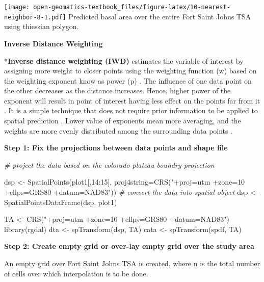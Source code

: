\documentclass[
]{book}
\newenvironment{Shaded}{\begin{snugshade}}{\end{snugshade}}
\newcommand{\AttributeTok}[1]{\textcolor[rgb]{0.77,0.63,0.00}{#1}}
\newcommand{\CommentTok}[1]{\textcolor[rgb]{0.56,0.35,0.01}{\textit{#1}}}
\newcommand{\DecValTok}[1]{\textcolor[rgb]{0.00,0.00,0.81}{#1}}
\newcommand{\FunctionTok}[1]{\textcolor[rgb]{0.00,0.00,0.00}{#1}}
\newcommand{\NormalTok}[1]{#1}
\newcommand{\OtherTok}[1]{\textcolor[rgb]{0.56,0.35,0.01}{#1}}
\newcommand{\SpecialCharTok}[1]{\textcolor[rgb]{0.00,0.00,0.00}{#1}}
\newcommand{\StringTok}[1]{\textcolor[rgb]{0.31,0.60,0.02}{#1}}
\begin{document}
\texttt{[image: open-geomatics-textbook\_files/figure-latex/10-nearest-neighbor-8-1.pdf]}
Predicted basal area over the entire Fort Saint Johns TSA using thiessian polygon.

\textbf{Inverse Distance Weighting}

*\textbf{Inverse distance weighting (IWD)} \citep{shepard_two-_1968} estimates the variable of interest by assigning more weight to closer points using the weighting function (w) based on the weighting exponent know as power (p) \citep{babak_statistical_2009}. The influence of one data point on the other decreases as the distance increases. Hence, higher power of the exponent will result in point of interest having less effect on the points far from it \citep{babak_statistical_2009}. It is a simple technique that does not require prior information to be applied to spatial prediction \citep{shepard_two-_1968}. Lower value of exponents mean more averaging, and the weights are more evenly distributed among the surrounding data points \citep{shepard_two-_1968}.

\textbf{Step 1: Fix the projections between data points and shape file}

\begin{Shaded}
\begin{Highlighting}[]
\CommentTok{\# project the data based on the colorado plateau boundry projection}

\NormalTok{dsp }\OtherTok{\textless{}{-}} \FunctionTok{SpatialPoints}\NormalTok{(plot1[,}\DecValTok{14}\SpecialCharTok{:}\DecValTok{15}\NormalTok{], }\AttributeTok{proj4string=}\FunctionTok{CRS}\NormalTok{(}\StringTok{"+proj=utm +zone=10 +ellps=GRS80 +datum=NAD83"}\NormalTok{))}
\CommentTok{\# convert the data into spatial object}
\NormalTok{dsp }\OtherTok{\textless{}{-}} \FunctionTok{SpatialPointsDataFrame}\NormalTok{(dsp, plot1)}

\NormalTok{TA }\OtherTok{\textless{}{-}} \FunctionTok{CRS}\NormalTok{(}\StringTok{"+proj=utm +zone=10 +ellps=GRS80 +datum=NAD83"}\NormalTok{)}
\FunctionTok{library}\NormalTok{(rgdal)}
\NormalTok{dta }\OtherTok{\textless{}{-}} \FunctionTok{spTransform}\NormalTok{(dsp, TA)}
\NormalTok{cata }\OtherTok{\textless{}{-}} \FunctionTok{spTransform}\NormalTok{(spdf, TA)}
\end{Highlighting}
\end{Shaded}

\textbf{Step 2: Create empty grid or over-lay empty grid over the study area}

An empty grid over Fort Saint Johns TSA is created, where n is the total number of cells over which interpolation is to be done.
\end{document}
